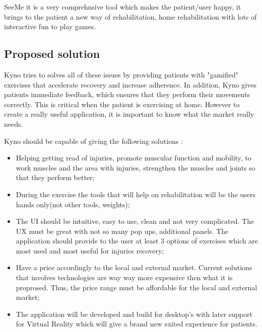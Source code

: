 SeeMe it is a very comprehnsive tool which makes the patient/user happy, it brings to the patient a new way of rehabilitation, home rehabilitation with lots of interactive fun to play games.


\subsection {Proposed solution}

Kyno tries to solves all of these issues by providing patients with "gamified" exercises that accelerate recovery and increase adherence. In addition, Kyno gives patients immediate feedback, which ensures that they perform their movements correctly. This is critical when the patient is exercising at home. However to create a really useful application, it is important to know what the market really needs.

Kyno should be capable of giving the following solutions :

\begin{itemize}
\item Helping getting read of injuries, promote muscular function and mobility, to work muscles and the area with injuries, strengthen the muscles and joints so that they perform better;
\item During the exercise the tools that will help on rehabilitation will be the users hands only(not other tools, weights);

\item The UI should be intuitive, easy to use, clean and not very complicated. The UX must be great with not so many pop ups, additional panels. The application should provide to the user at least 3 options of exercises which are most used and most useful for injuries recovery;
\item Have a price accordingly to the local and external market. Current solutions that involves technologies are way way more expensive then what it is proprosed. Thus, the price range must be affordable for the local and external market;
\item The application will be developed and build for desktop's with later support for Virtual Reality which will give a brand new exited experience for patients.
\end{itemize}

